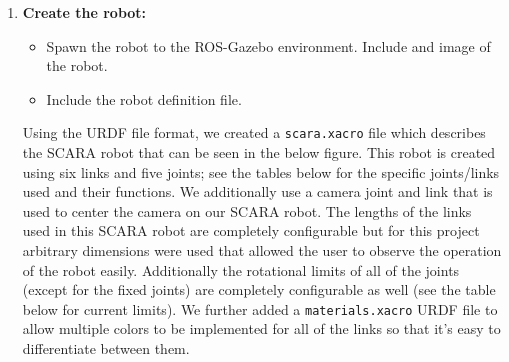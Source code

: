 \documentclass[10pt]{article}
\begin{document}
\begin{enumerate}
	\item \textbf{Create the robot:}
	
	\begin{itemize}
		\item Spawn the robot to the ROS-Gazebo environment. Include and image of the robot.
		
		\item Include the robot definition file.
	\end{itemize}

	Using the URDF file format, we created a \texttt{scara.xacro} file which describes the SCARA robot that can be seen in the below figure. This robot is created using six links and five joints; see the tables below for the specific joints/links used and their functions. We additionally use a camera joint and link that is used to center the camera on our SCARA robot. The lengths of the links used in this SCARA robot are completely configurable but for this project arbitrary dimensions were used that allowed the user to observe the operation of the robot easily. Additionally the rotational limits of all of the joints (except for the fixed joints) are completely configurable as well (see the table below for current limits). We further added a \texttt{materials.xacro} URDF file to allow multiple colors to be implemented for all of the links so that it's easy to differentiate between them. 
	

\end{enumerate}
\end{document}
